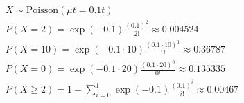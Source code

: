 \documentclass{article}
\begin{document}
            \begin{gather*}
                X \sim \text{Poisson}(\mu t = 0.1 t) \\
                P(X = 2) = \exp(-0.1) \frac{(0.1)^{2}}{2!} \approx 0.004524 \\
                P(X = 10) = \exp(-0.1 \cdot 10) \frac{(0.1 \cdot 10)^{1}}{1!} \approx 0.36787 \\
                P(X = 0) = \exp(-0.1 \cdot 20) \frac{(0.1 \cdot 20)^{0}}{0!} \approx 0.135335 \\
                P(X \geq 2) = 1 - \sum_{i=0}^{1} \exp(-0.1) \frac{(0.1)^{i}}{i!} \approx 0.00467
            \end{gather*}
\end{document}
